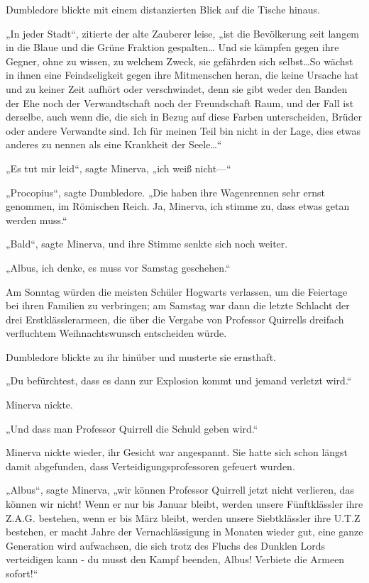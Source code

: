 {Dumbledore blickte mit einem distanzierten Blick auf die Tische hinaus.

„In jeder Stadt“, zitierte der alte Zauberer leise, „ist die Bevölkerung seit langem in die Blaue und die Grüne Fraktion gespalten… Und sie kämpfen gegen ihre Gegner, ohne zu wissen, zu welchem Zweck, sie gefährden sich selbst…So wächst in ihnen eine Feindseligkeit gegen ihre Mitmenschen heran, die keine Ursache hat und zu keiner Zeit aufhört oder verschwindet, denn sie gibt weder den Banden der Ehe noch der Verwandtschaft noch der Freundschaft Raum, und der Fall ist derselbe, auch wenn die, die sich in Bezug auf diese Farben unterscheiden, Brüder oder andere Verwandte sind. Ich für meinen Teil bin nicht in der Lage, dies etwas anderes zu nennen als eine Krankheit der Seele…“

„Es tut mir leid“, sagte Minerva, „ich weiß nicht—“

„Procopius“, sagte Dumbledore. „Die haben ihre Wagenrennen sehr ernst genommen, im Römischen Reich. Ja, Minerva, ich stimme zu, dass etwas getan werden muss.“

„Bald“, sagte Minerva, und ihre Stimme senkte sich noch weiter.

„Albus, ich denke, es muss vor Samstag geschehen.“

Am Sonntag würden die meisten Schüler Hogwarts verlassen, um die Feiertage bei ihren Familien zu verbringen; am Samstag war dann die letzte Schlacht der drei Erstklässlerarmeen, die über die Vergabe von Professor Quirrells dreifach verfluchtem Weihnachtswunsch entscheiden würde.

Dumbledore blickte zu ihr hinüber und musterte sie ernsthaft.

„Du befürchtest, dass es dann zur Explosion kommt und jemand verletzt wird.“

Minerva nickte.

„Und dass man Professor Quirrell die Schuld geben wird.“

Minerva nickte wieder, ihr Gesicht war angespannt. Sie hatte sich schon längst damit abgefunden, dass Verteidigungsprofessoren gefeuert wurden.

„Albus“, sagte Minerva, „wir können Professor Quirrell jetzt nicht verlieren, das können wir nicht! Wenn er nur bis Januar bleibt, werden unsere Fünftklässler ihre Z.A.G. bestehen, wenn er bis März bleibt, werden unsere Siebtklässler ihre U.T.Z bestehen, er macht Jahre der Vernachlässigung in Monaten wieder gut, eine ganze Generation wird aufwachsen, die sich trotz des Fluchs des Dunklen Lords verteidigen kann - du musst den Kampf beenden, Albus! Verbiete die Armeen sofort!“

}
